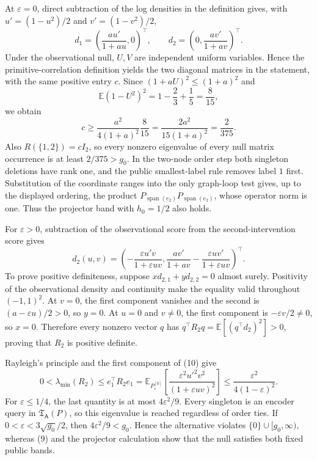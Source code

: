 At \(\varepsilon=0\), direct subtraction of the log densities in the definition gives, with \(u'=(1-u^2)/2\) and \(v'=(1-v^2)/2\),
\[
 d_1=\left(\frac{au'}{1+au},0\right)^{\!\top},
 \qquad
 d_2=\left(0,\frac{av'}{1+av}\right)^{\!\top}.
\]
Under the observational null, \(U,V\) are independent uniform variables.  Hence the primitive-correlation definition yields the two diagonal matrices in the statement, with the same positive entry \(c\).  Since \((1+aU)^2\le(1+a)^2\) and
\[
 \mathbb E(1-U^2)^2=1-\frac23+\frac15=\frac8{15},
\]
we obtain
\[
 c\ge\frac{a^2}{4(1+a)^2}\frac8{15}
 =\frac{2a^2}{15(1+a)^2}=\frac2{375}.
 \tag{9}
\]
Also \(R(\{1,2\})=cI_2\), so every nonzero eigenvalue of every null matrix occurrence is at least \(2/375>g_0\).  In the two-node order step both singleton deletions have rank one, and the public smallest-label rule removes label \(1\) first.  Substitution of the coordinate ranges into the only graph-loop test gives, up to the displayed ordering, the product \(P_{\operatorname{span}(e_2)}P_{\operatorname{span}(e_2)}\), whose operator norm is one.  Thus the projector band with \(h_0=1/2\) also holds.

For \(\varepsilon>0\), subtraction of the observational score from the second-intervention score gives
\[
 d_2(u,v)=
 \left(
 -\frac{\varepsilon u'v}{1+\varepsilon uv},
 \frac{av'}{1+av}-\frac{\varepsilon uv'}{1+\varepsilon uv}
 \right)^{\!\top}.
 \tag{10}
\]
To prove positive definiteness, suppose \(x d_{2,1}+y d_{2,2}=0\) almost surely.  Positivity of the observational density and continuity make the equality valid throughout \((-1,1)^2\).  At \(v=0\), the first component vanishes and the second is \((a-\varepsilon u)/2>0\), so \(y=0\).  At \(u=0\) and \(v\ne0\), the first component is \(-\varepsilon v/2\ne0\), so \(x=0\).  Therefore every nonzero vector \(q\) has
\(
q^{\top}R_2q=\mathbb E[(q^{\top}d_2)^2]>0
\), proving that \(R_2\) is positive definite.

Rayleigh's principle and the first component of (10) give
\[
 0<\lambda_{\min}(R_2)
 \le e_1^{\top}R_2e_1
 =\mathbb E_{P_{\varepsilon}^{[0]}}\!\left[
   \frac{\varepsilon^2u'^2v^2}{(1+\varepsilon uv)^2}
 \right]
 \le\frac{\varepsilon^2}{4(1-\varepsilon)^2}.
\]
For \(\varepsilon\le1/4\), the last quantity is at most \(4\varepsilon^2/9\).  Every singleton is an encoder query in \(\mathfrak T_{\mathsf A}(P)\), so this eigenvalue is reached regardless of order ties.  If \(0<\varepsilon<3\sqrt{g_0}/2\), then \(4\varepsilon^2/9<g_0\).  Hence the alternative violates \(\{0\}\cup[g_0,\infty)\), whereas (9) and the projector calculation show that the null satisfies both fixed public bands.

